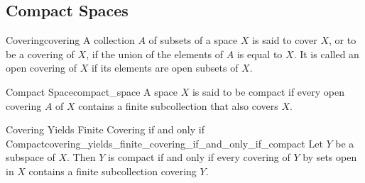\subsection{Compact Spaces}

\begin{definition}{Covering}{covering}
A collection $A$ of subsets of a space $X$ is said to cover $X$, or to be a covering of $X$, if the union of the elements of $A$ is equal to $X$. It is called an open covering of $X$ if its elements are open subsets of $X$.
\end{definition}

\begin{definition}{Compact Space}{compact_space}
A space $X$ is said to be compact if every open covering $A$ of $X$ contains a finite subcollection that also covers $X$.
\end{definition}

\begin{lemma}{Covering Yields Finite Covering if and only if Compact}{covering_yields_finite_covering_if_and_only_if_compact}
Let $Y$ be a subspace of $X$. Then $Y$ is compact if and only if every covering of $Y$ by sets open in $X$ contains a finite subcollection covering $Y$.
\end{lemma}
